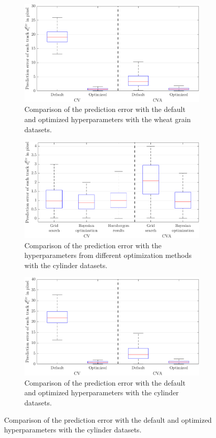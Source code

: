 \begin{figure}
    \ContinuedFloat
    \centering
	\begin{subfigure}[t]{0.8\textwidth}
		\includegraphics[width=\textwidth]{figures/KF/bayopt/effectOpt weizen2.png}
		\caption{Comparison of the prediction error with the default and optimized hyperparameters with the wheat grain datasets.}
	\end{subfigure}
	\begin{subfigure}[t]{0.8\textwidth}
		\includegraphics[width=\textwidth]{figures/KF/bayopt/effectOpt zylinder1.png}
		\caption{Comparison of the prediction error with the hyperparameters from different optimization methods with the cylinder datasets.}
	\end{subfigure}
	\begin{subfigure}[t]{0.8\textwidth}
		\includegraphics[width=\textwidth]{figures/KF/bayopt/effectOpt zylinder2.png}
		\caption{Comparison of the prediction error with the default and optimized hyperparameters with the cylinder datasets.}
	\end{subfigure}
\end{figure}

